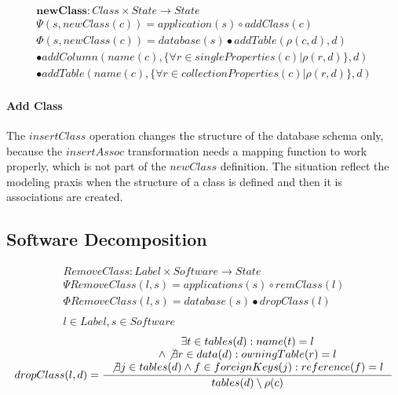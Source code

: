 \documentclass[11pt]{article}
\begin{document}
\begin{align*}
\mathbf{newClass} : Class \times State \rightarrow State \\
\Psi(s, newClass(c)) = application(s) \circ addClass(c) \\
\Phi(s, newClass(c)) = database(s)  \bullet addTable(\rho(c,d), d) \\ \bullet addColumn(name(c), \{\forall r \in singleProperties(c) | \rho(r,d)\}, d) \\ \bullet addTable(name(c), \{\forall r \in collectionProperties(c) | \rho(r,d)\}, d)  
\end{align*}

\paragraph{Add Class} The $insertClass$ operation changes the structure of the database schema only, because the $insertAssoc$ transformation needs a mapping function to work properly, which is not part of the $newClass$ definition. The situation reflect the modeling praxis when the structure of a class is defined and then it is associations are created.



\subsection{Software Decomposition}
\begin{align*}
RemoveClass: Label \times Software \rightarrow State  \\
\Psi RemoveClass(l, s) = applications(s) \circ remClass(l) \\
\Phi RemoveClass(l, s) = database(s) \bullet dropClass(l) \\
\\ l \in Label, s \in Software 
\end{align*}
\begin{align*}
dropClass(l,d) = \inference{ \exists t \in tables(d) : name(t) = l  \\ \wedge \not \exists r \in data(d) : owningTable(r) = l \\  \not \exists j \in tables(d) \wedge f \in foreignKeys(j) : reference(f) = l }{ tables(d) \setminus \rho(c)}
\end{align*}
\end{document}
